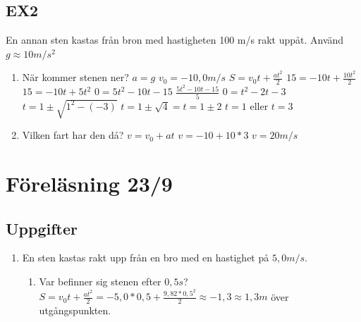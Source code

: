 \documentclass[a4paper,11pt]{article}
\begin{document}
\begin{flushleft}
\begin{enumerate}
  \subsection{EX2}
  En annan sten kastas från bron med hastigheten 100 m/s rakt uppåt. Använd $g\approx 10m/s^2$
  \begin{enumerate}
    \item När kommer stenen ner?\newline
      $ a = g $\newline
      $ v_0 = -10,0 m/s $\newline
      $ S = v_0t+\frac{at^2}{2} $\newline
      $ 15 = -10t+\frac{10t^2}{2} $\newline
      $ 15 = -10t+5t^2 $\newline
      $ 0 = 5t^2-10t-15 $\newline
      $ \frac{5t^2-10t-15}{5} $\newline
      $ 0 = t^2-2t-3 $\newline
      $ t = 1 \pm \sqrt{1^2-(-3)} $\newline 
      $ t = 1 \pm \sqrt{4} = t = 1 \pm 2 $\newline 
      $ t = 1 $ eller $ t = 3 $\newline
    \item Vilken fart har den då?
    $ v = v_0+at $\newline
    $ v = -10+10*3 $\newline
    $ v = 20 m/s $
  \end{enumerate}
\end{enumerate}
\section{Föreläsning 23/9}
\subsection{Uppgifter}
\begin{enumerate}
  \item En sten kastas rakt upp från en bro med en hastighet på $5,0m/s$.\newline
  \begin{enumerate}
    \item Var befinner sig stenen efter $0,5s$?\newline
    $ S = v_0t+\frac{at^2}{2} = -5,0*0,5+\frac{9,82*0,5^2}{2} \approx -1,3 \approx 1,3 m $ över utgångspunkten.\newline
    

\end{enumerate}
\end{enumerate}
\end{flushleft}
\end{document}
